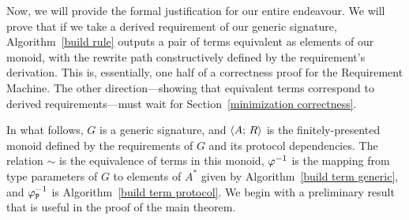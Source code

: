 \documentclass[../generics]{subfiles}
\begin{document}
Now, we will provide the formal justification for our entire endeavour. We will prove that if we take a derived requirement of our generic signature, Algorithm~\ref{build rule} outputs a pair of terms equivalent as elements of our monoid, with the rewrite path constructively defined by the requirement's derivation. This is, essentially, one half of a correctness proof for the Requirement Machine. The other direction---showing that equivalent terms correspond to derived requirements---must wait for Section~\ref{minimization correctness}.

In what follows, $G$ is a generic signature, and $\langle A;\,R\rangle$ is the finitely-presented monoid defined by the requirements of $G$ and its protocol dependencies. The relation $\sim$ is the equivalence of terms in this monoid, $\varphi^{-1}$ is the mapping from type parameters of $G$ to elements of $A^*$ given by Algorithm~\ref{build term generic}, and $\varphi^{-1}_\texttt{P}$ is Algorithm~\ref{build term protocol}. We begin with a preliminary result that is useful in the proof of the main theorem.
\end{document}
